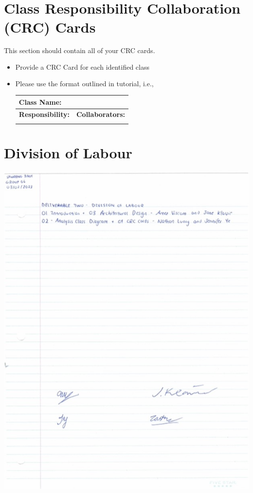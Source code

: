 \documentclass[]{article}
\begin{document}
	
\section{Class Responsibility Collaboration (CRC) Cards}
\label{sec:class_responsibility_collaboration_crc_cards}
This section should contain all of your CRC cards.

\begin{itemize}
	\item Provide a CRC Card for each identified class
	\item Please use the format outlined in tutorial, i.e., 
	\begin{table}[ht]
		\centering
		\begin{tabular}{|p{5cm}|p{5cm}|}
		\hline 
		 \multicolumn{2}{|l|}{\textbf{Class Name:}} \\
		\hline
		\textbf{Responsibility:} & \textbf{Collaborators:} \\
		\hline
		\vspace{1in} & \\
		\hline
		\end{tabular}
	\end{table}
	
\end{itemize}

\appendix
\section{Division of Labour}
\label{sec:division_of_labour}
\includegraphics[scale = 0.6]{Graphics/DivisionOfLabour.jpg}
\end{document}

